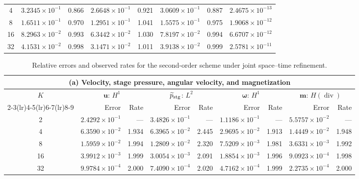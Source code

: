 \documentclass[11pt,a4paper]{article}
\newcommand{\bs}{\boldsymbol}
\DeclareMathOperator{\ddiv}{div}
\newcommand{\Div}{\ddiv}
\newcommand{\pp}{\widetilde p}
\theoremstyle{definition}
\numberwithin{equation}{section}
\begin{document}
\begin{table}[H]
\begin{tabular}{@{}c*{7}{r}@{}}
4 & $3.2345\!\times\!10^{-1}$ & 0.866 & $2.6648\!\times\!10^{-1}$ & 0.921 & $3.0609\!\times\!10^{-1}$ & 0.887 & $2.4675\!\times\!10^{-13}$\\
8 & $1.6511\!\times\!10^{-1}$ & 0.970 & $1.2951\!\times\!10^{-1}$ & 1.041 & $1.5575\!\times\!10^{-1}$ & 0.975 & $1.9068\!\times\!10^{-12}$\\
16 & $8.2963\!\times\!10^{-2}$ & 0.993 & $6.3442\!\times\!10^{-2}$ & 1.030 & $7.8197\!\times\!10^{-2}$ & 0.994 & $6.6707\!\times\!10^{-12}$\\
32 & $4.1531\!\times\!10^{-2}$ & 0.998 & $3.1471\!\times\!10^{-2}$ & 1.011 & $3.9138\!\times\!10^{-2}$ & 0.999 & $2.5781\!\times\!10^{-11}$\\
\bottomrule
\end{tabular}
\endgroup
\end{table}
\begin{table}[H]
\centering
\caption{Relative errors and observed rates for the second-order scheme under joint space--time refinement.}
\label{tab:second-order-errors}
\begingroup
\small
\setlength{\tabcolsep}{3.5pt}
\renewcommand{\arraystretch}{1.10}
\begin{tabular}{@{}c*{8}{r}@{}}
\toprule
\multicolumn{9}{c}{(a) Velocity, stage pressure, angular velocity, and magnetization}\\
\midrule
$K$ & \multicolumn{2}{c}{$\bs u$: $H^1$} & \multicolumn{2}{c}{$\pp_{\rm stg}$: $L^2$} & \multicolumn{2}{c}{$\bs\omega$: $H^1$} & \multicolumn{2}{c}{$\bs m$: $H(\Div)$}\\
\cmidrule(lr){2-3}\cmidrule(lr){4-5}\cmidrule(lr){6-7}\cmidrule(lr){8-9}
 & Error & Rate & Error & Rate & Error & Rate & Error & Rate\\
\midrule
2 & $2.4292\!\times\!10^{-1}$ & --- & $3.4826\!\times\!10^{-1}$ & --- & $1.1186\!\times\!10^{-1}$ & --- & $5.5757\!\times\!10^{-2}$ & ---\\
4 & $6.3590\!\times\!10^{-2}$ & 1.934 & $6.3965\!\times\!10^{-2}$ & 2.445 & $2.9695\!\times\!10^{-2}$ & 1.913 & $1.4449\!\times\!10^{-2}$ & 1.948\\
8 & $1.5959\!\times\!10^{-2}$ & 1.994 & $1.2809\!\times\!10^{-2}$ & 2.320 & $7.5209\!\times\!10^{-3}$ & 1.981 & $3.6331\!\times\!10^{-3}$ & 1.992\\
16 & $3.9912\!\times\!10^{-3}$ & 1.999 & $3.0054\!\times\!10^{-3}$ & 2.091 & $1.8854\!\times\!10^{-3}$ & 1.996 & $9.0923\!\times\!10^{-4}$ & 1.998\\
32 & $9.9784\!\times\!10^{-4}$ & 2.000 & $7.4090\!\times\!10^{-4}$ & 2.020 & $4.7162\!\times\!10^{-4}$ & 1.999 & $2.2735\!\times\!10^{-4}$ & 2.000\\

\end{tabular}
\end{table}
\end{document}
